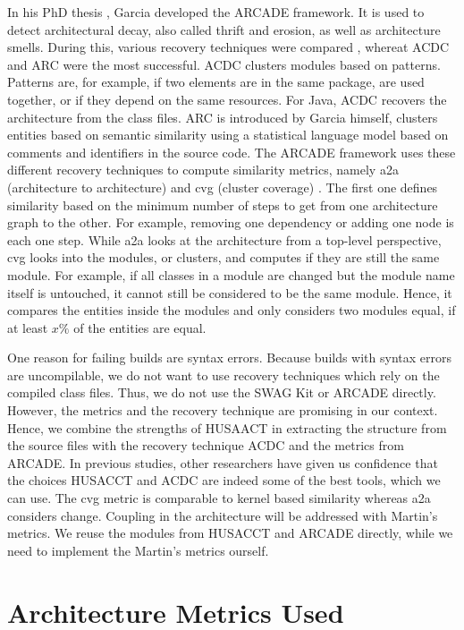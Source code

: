 \documentclass[sigplan, anonymous, review]{acmart}
\begin{document}
In his PhD thesis \cite{arcade-thesis}, Garcia developed the ARCADE framework. It is used to detect architectural decay, also called thrift and erosion, as well as architecture smells. During this, various recovery techniques were compared \cite{arcRec-comparison}, whereat ACDC \cite{ACDC} and ARC were the most successful. 
ACDC clusters modules based on patterns. Patterns are, for example, if two elements are in the same package, are used together, or if they depend on the same resources. For Java, ACDC recovers the architecture from the class files. ARC is introduced by Garcia himself, clusters entities based on semantic similarity using a statistical language model based on comments and identifiers in the source code.
The ARCADE framework uses these different recovery techniques to compute similarity metrics, namely a2a (architecture to architecture) and cvg (cluster coverage) \cite{Arcade}. 
The first one defines similarity based on the minimum number of steps to get from one architecture graph to the other. For example, removing one dependency or adding one node is each one step. While a2a looks at the architecture from a top-level perspective, cvg looks into the modules, or clusters, and computes if they are still the same module. For example, if all classes in a module are changed but the module name itself is untouched, it cannot still be considered to be the same module. Hence, it compares the entities inside the modules and only considers two modules equal, if at least $x \%$ of the entities are equal.

One reason for failing builds are syntax errors. Because builds with syntax errors are uncompilable, we do not want to use recovery techniques which rely on the compiled class files. Thus, we do not use the SWAG Kit or ARCADE directly.
However, the metrics and the recovery technique are promising in our context. Hence, we combine the strengths of HUSAACT in extracting the structure from the source files with the recovery technique ACDC and the metrics from ARCADE. 
In previous studies, other researchers \cite{MScSteffen, arcRec-comparison} have given us confidence that the choices HUSACCT and ACDC are indeed some of the best tools, which we can use.
The cvg metric is comparable to kernel based similarity whereas a2a considers change. Coupling in the architecture will be addressed with Martin's metrics. We reuse the modules from HUSACCT and ARCADE directly, while we need to implement the Martin's metrics ourself. 

\section{Architecture Metrics Used} \label{sec:Metrics}
\end{document}
